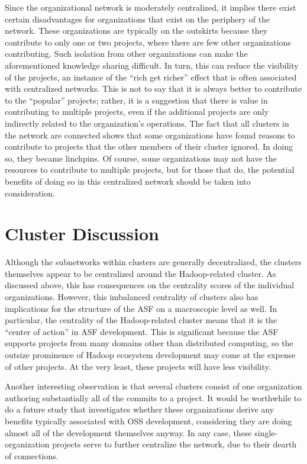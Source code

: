 Since the organizational network is moderately centralized, it implies there exist certain disadvantages for organizations that exist on the periphery of the network. These organizations are typically on the outskirts because they contribute to only one or two projects, where there are few other organizations contributing. Such isolation from other organizations can make the aforementioned knowledge sharing difficult. In turn, this can reduce the visibility of the projects, an instance of the ``rich get richer'' effect that is often associated with centralized networks. This is not to say that it is always better to contribute to the ``popular'' projects; rather, it is a suggestion that there is value in contributing to multiple projects, even if the additional projects are only indirectly related to the organization's operations. The fact that all clusters in the network are connected shows that some organizations have found reasons to contribute to projects that the other members of their cluster ignored. In doing so, they became linchpins. Of course, some organizations may not have the resources to contribute to multiple projects, but for those that do, the potential benefits of doing so in this centralized network should be taken into consideration.

 
\section{Cluster Discussion}
Although the subnetworks within clusters are generally decentralized, the clusters themselves appear to be centralized around the Hadoop-related cluster. As discussed above, this has consequences on the centrality scores of the individual organizations. However, this imbalanced centrality of clusters also has implications for the structure of the ASF on a macroscopic level as well. In particular, the centrality of the Hadoop-related cluster means that it is the ``center of action'' in ASF development. This is significant because the ASF supports projects from many domains other than distributed computing, so the outsize prominence of Hadoop ecosystem development may come at the expense of other projects. At the very least, these projects will have less visibility.

Another interesting observation is that several clusters consist of one organization authoring substantially all of the commits to a project. It would be worthwhile to do a future study that investigates whether these organizations derive any benefits typically associated with OSS development, considering they are doing almost all of the development themselves anyway. In any case, these single-organization projects serve to further centralize the network, due to their dearth of connections.